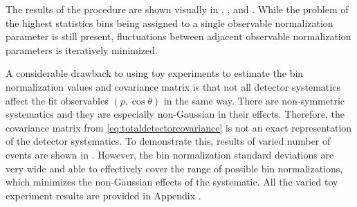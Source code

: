 The results of the procedure are shown visually in ,
, and .
While the problem of the highest statistics bins being assigned to
a single observable normalization parameter is still present, fluctuations
between adjacent observable normalization parameters is iteratively
minimized. 

A considerable drawback to using toy experiments to estimate the bin
normalization values and covariance matrix is that not all detector
systematics affect the fit observables $(p,\cos\theta)$ in the same
way. There are non-symmetric systematics and they are especially non-Gaussian
in their effects. Therefore, the covariance matrix from \eqref{eq:totaldetectorcovariance}
is not an exact representation of the detector systematics. To demonstrate
this, results of varied number of events are shown in .
However, the bin normalization standard deviations are very wide and
able to effectively cover the range of possible bin normalizations,
which minimizes the non-Gaussian effects of the systematic. All the
varied toy experiment results are provided in Appendix .

